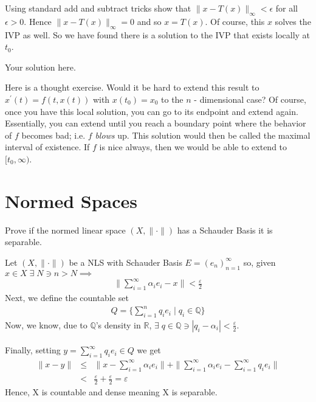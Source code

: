 \documentclass[11pt]{SelfArxOneColBMN}
\begin{document}
\begin{exercise}
Using standard add and subtract tricks show that
$\|x - T(x)\|_\infty < \epsilon$ for all $\epsilon > 0$.
Hence $\|x - T(x)\|_\infty = 0$ and so $x = T(x)$.
Of course, this $x$ solves the IVP as well.
So we have found there is a solution to the IVP
that exists locally at $t_0$.
\end{exercise}

\begin{solution}
Your solution here.
\end{solution}

\noindent
Here is a thought exercise.  Would it be hard to extend
this result to $x^\prime(t) = f(t,x(t))$ with $x(t_0) = x_0$ to the
$n$ - dimensional case?
Of course, once you have this local solution, you can go to its
endpoint and extend again.  Essentially, you can extend
until you reach a boundary point where the behavior of $f$
becomes bad; i.e. $f$ {\em blows} up.  This solution
would then be called the maximal interval of existence.
If $f$ is nice always, then we would be able to extend
to $[t_0, \infty)$.

\section{Normed Spaces}

\begin{exercise}
Prove if the normed linear space $(X, \| \cdot\|)$ has a
Schauder Basis it is separable.
\end{exercise}

\begin{solution}
Let $(X,\|\cdot\|)$ be a NLS with Schauder Basis $E = (e_n)_{n=1}^\infty$ so, given $x \in X \; \exists \; N \ni n > N \implies$
\begin{eqnarray*}
  \|\sum_{i = 1}^\infty\alpha_ie_i - x \| < \frac{\varepsilon}{2}
\end{eqnarray*}
Next, we define the countable set
\begin{eqnarray*}
  Q = \{\sum_{i = 1}^nq_ie_i \; | \; q_i \in \mathbb{Q}\}
\end{eqnarray*}
Now, we know, due to $\mathbb{Q}$'s density in $\mathbb{R}$, $\exists \; q \in \mathbb{Q} \ni |q_i - \alpha_i| < \frac{\varepsilon}{2}$.\\
\\
Finally, setting $y = \sum_{i = 1}^\infty q_ie_i \in Q$ we get
\begin{eqnarray*}
  \|x - y\| &\leq& \|x - \sum_{i = 1}^\infty \alpha_i e_i \| + \|\sum_{i = 1}^\infty \alpha_i e_i  - \sum_{i = 1}^\infty q_i e_i \|\\
  &<& \frac{\varepsilon}{2} + \frac{\varepsilon}{2} = \varepsilon
\end{eqnarray*}
Hence, X is countable and dense meaning X is separable.
\end{solution}
\end{document}

